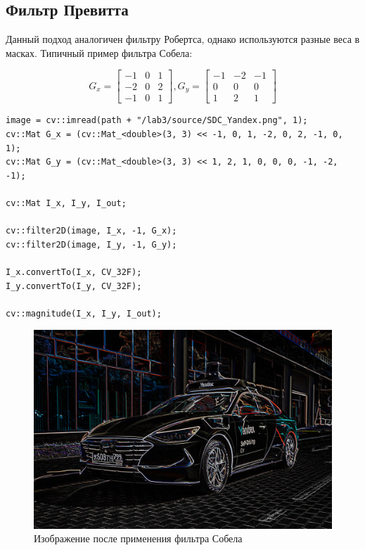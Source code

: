 \pagebreak

\subsection{Фильтр Превитта}

Данный подход аналогичен фильтру Робертса, однако используются разные веса в масках. 
Типичный пример фильтра Собела:

\begin{equation}
    G_x = \begin{bmatrix}
        -1 & 0 & 1 \\
        -2 & 0 & 2 \\
        -1 & 0 & 1
    \end{bmatrix}, 
    G_y = \begin{bmatrix}
        -1 & -2 & -1 \\
        0 & 0 & 0 \\
        1 & 2 & 1
    \end{bmatrix}
\end{equation}

\begin{lstlisting}[style=cpp_white, caption={Исходный код фильтра Собела}]
image = cv::imread(path + "/lab3/source/SDC_Yandex.png", 1);
cv::Mat G_x = (cv::Mat_<double>(3, 3) << -1, 0, 1, -2, 0, 2, -1, 0, 1);
cv::Mat G_y = (cv::Mat_<double>(3, 3) << 1, 2, 1, 0, 0, 0, -1, -2, -1);

cv::Mat I_x, I_y, I_out;

cv::filter2D(image, I_x, -1, G_x);
cv::filter2D(image, I_y, -1, G_y);

I_x.convertTo(I_x, CV_32F);
I_y.convertTo(I_y, CV_32F);

cv::magnitude(I_x, I_y, I_out);
\end{lstlisting}

\begin{figure}[ht]
    \centering
    \includegraphics[width=\textwidth]{../outputs/sobel_operator.png}
    \caption{Изображение после применения фильтра Собела}
    \label{fig:stitch_images}
\end{figure}

